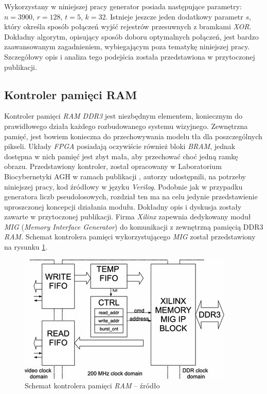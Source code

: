 Wykorzystany w niniejszej pracy generator posiada następujące parametry: $n=3900$, $r=128$, $t=5$, $k=32$. 
Istnieje jeszcze jeden dodatkowy parametr $s$, który określa sposób połączeń wyjść rejestrów przesuwnych z bramkami \textit{XOR}. 
Dokładny algorytm, opisujący sposób doboru optymalnych połączeń, jest bardzo zaawansowanym zagadnieniem, wybiegającym poza tematykę niniejszej pracy. 
Szczegółowy opis i analiza tego podejścia została przedstawiona w przytoczonej publikacji.

\subsection{Kontroler pamięci RAM}
\label{subsec:fpga_ram_kontroler}

Kontroler pamięci \textit{RAM DDR3} jest niezbędnym elementem, koniecznym do prawidłowego działa każdego rozbudowanego systemu wizyjnego. Zewnętrzna pamięć, jest bowiem konieczna do przechowywania modelu tła dla poszczególnych pikseli. Układy \textit{FPGA} posiadają oczywiście również bloki \textit{BRAM}, jednak dostępna w nich pamięć jest zbyt mała, aby przechować choć jedną ramkę obrazu. %
Przedstawiony kontroler, został opracowany w Laboratorium Biocybernetyki AGH w ramach publikacji \cite{kryjak_14_hd_fpga}, autorzy udostępnili, na potrzeby niniejszej pracy, kod źródłowy w języku \textit{Verilog}.
Podobnie jak w przypadku generatora liczb pseudolosowych, rozdział ten ma na celu jedynie przedstawienie uproszczonej koncepcji działania modułu.
Dokładny opis i dyskusja zostały zawarte w przytoczonej publikacji. 
Firma \textit{Xilinx} zapewnia dedykowany moduł \textit{MIG} (\textit{Memory Interface Generator}) do komunikacji z zewnętrzną pamięcią DDR3 \textit{RAM}. 
Schemat kontrolera pamięci wykorzystującego \textit{MIG} został przedstawiony na rysunku \ref{fig:ram_ctrl}. 

	\begin{figure}[h!]
		\centering
		\includegraphics[scale=0.9]{img/4/ram_ctrl_scheme.jpg}
		\caption{Schemat kontrolera pamięci \textit{RAM} -- źródło \cite{kryjak_14_hd_fpga}}
		\label{fig:ram_ctrl}
	\end{figure}

